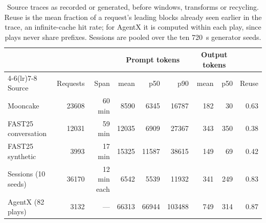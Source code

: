 \begin{table}[tbp]
  \centering\small
  \caption{Source traces as recorded or generated, before windows, transforms or recycling.
    Reuse is the mean fraction of a request's leading blocks already seen earlier in the trace,
    an infinite-cache hit rate; for AgentX it is computed within each play, since plays never
    share prefixes. Sessions are pooled over the ten \SI{720}{s} generator seeds.}
  \label{tab:trace-stats}
  \begin{tabular}{@{}lrrrrrrrr@{}}
    \toprule
    & & & \multicolumn{3}{c}{Prompt tokens} & \multicolumn{2}{c}{Output tokens} & \\
    \cmidrule(lr){4-6}\cmidrule(lr){7-8}
    Source & Requests & Span & mean & p50 & p90 & mean & p50 & Reuse \\
    \midrule
    Mooncake            & \num{23608} & 60 min & \num{8590}  & \num{6345}  & \num{16787}  & 182 & 30  & 0.63 \\
    FAST25 conversation & \num{12031} & 59 min & \num{12035} & \num{6909}  & \num{27367}  & 343 & 350 & 0.38 \\
    FAST25 synthetic    & \num{3993}  & 17 min & \num{15325} & \num{11587} & \num{38615}  & 149 & 69  & 0.42 \\
    Sessions (10 seeds) & \num{36170} & 12 min each & \num{6542} & \num{5539} & \num{11932} & 341 & 249 & 0.83 \\
    AgentX (82 plays)   & \num{3132}  & ---    & \num{66313} & \num{66944} & \num{103488} & 749 & 314 & 0.87 \\
    \bottomrule
  \end{tabular}
\end{table}

